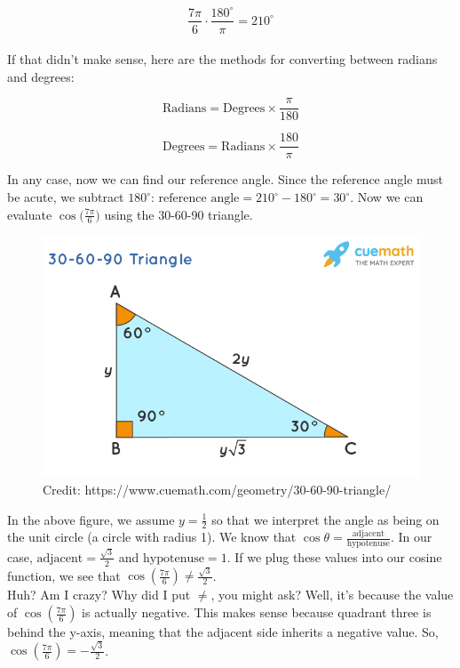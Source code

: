 \documentclass[12pt]{article}
\begin{document}
\[\frac{7\pi}{6}\cdot\frac{180^{\circ}}{\pi}=210^{\circ}\]\\

If that didn't make sense, here are the methods for converting between radians and degrees:

\[ \text{Radians} = \text{Degrees} \times \frac{\pi}{180} \]

\[ \text{Degrees} = \text{Radians} \times \frac{180}{\pi} \]

In any case, now we can find our reference angle. Since the reference angle must be acute, we subtract \(180^{\circ}\): \(\text{reference angle}=210^{\circ}-180^{\circ}=30^{\circ}\). Now we can evaluate \(\cos({\frac{7\pi}{6})}\) using the 30-60-90 triangle.\\ 
\begin{figure}[ht]
	\centering
	\includegraphics[scale=0.5]{30-60-90-triangle-1621153010}
	\caption{Credit: https://www.cuemath.com/geometry/30-60-90-triangle/}
\end{figure}

In the above figure, we assume \( y=\frac{1}{2} \) so that we interpret the angle as being on the unit circle (a circle with radius 1). We know that \(\cos \theta = \frac{\text{adjacent}}{\text{hypotenuse}}\). In our case, \(\text{adjacent} = \frac{\sqrt{3}}{2}\) and \(\text{hypotenuse} = 1\). If we plug these values into our cosine function, we see that \(\cos\left(\frac{7\pi}{6}\right) \neq \frac{\sqrt{3}}{2}\). \\

Huh? Am I crazy? Why did I put \(\neq\), you might ask? Well, it's because the value of \(\cos\left(\frac{7\pi}{6}\right)\) is actually negative. This makes sense because quadrant three is behind the y-axis, meaning that the adjacent side inherits a negative value. So, \(\cos\left(\frac{7\pi}{6}\right) = -\frac{\sqrt{3}}{2}\).\\
\end{document}
